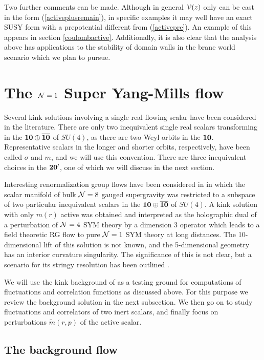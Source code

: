 \documentclass[a4paper,12pt]{article}
\def\mt{\tilde{m}}
\begin{document}
Two further comments can be made.  Although in general ${\cal V}(z)$
only can be cast in the form (\ref{activeplusremain}), in specific
examples it may well have an exact SUSY form with a prepotential
different from (\ref{activepre}).  An example of this appears in
section \ref{coulombactive}.  Additionally, it is also clear that the
analysis above has applications to the stability of domain
walls in the brane world scenario \cite{rs1,rs2} which we plan to
pursue.

\section{The ${\cal N} = 1$ Super Yang-Mills flow}
\label{sym}


Several kink solutions involving a single real flowing scalar have
been considered in the literature.  There are only two inequivalent
single real scalars transforming in the ${\bf 10} \oplus {\bf
\overline{10}}$ of $SU(4)$, as there are two Weyl orbits in the ${\bf
10}$.  Representative scalars in the longer and shorter orbits,
respectively, have been called $\sigma$ and $m$, and we will use this
convention.  There are three inequivalent choices in the ${\bf 20'}$, one of
which we will discuss in the next section.

Interesting renormalization group flows have been considered in
\cite{gppz} in which the scalar manifold of bulk ${\cal N}=8$ gauged
supergravity was restricted to a subspace of two particular
inequivalent scalars in the ${\bf 10} \oplus {\bf \overline{10}}$ of
$SU(4)$.  A kink solution with only $m(r)$ active was obtained and
interpreted as the holographic dual of a perturbation of ${\cal N}=4$
SYM theory by a dimension 3 operator which leads to a field theoretic
RG flow to pure ${\cal N}=1$ SYM theory at long distances. The
10-dimensional lift of this solution is not known, and the
5-dimensional geometry has an interior curvature singularity. The
significance of this is not clear, but a scenario for its stringy
resolution has been outlined \cite{sp}.

We will use the kink background of \cite{gppz} as a testing ground for
computations of fluctuations and correlation functions as discussed
above.  For this purpose we review the background solution in the next
subsection. We then go on to study fluctuations and correlators of two
inert scalars, and finally focus on perturbations $\mt(r,p)$ of the
active scalar.


\subsection{The background flow}
\end{document}
